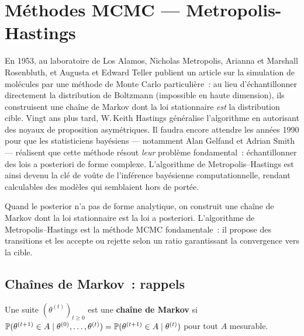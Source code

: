 \chapter{M\'ethodes MCMC --- Metropolis-Hastings}
\label{ch:metropolis}

En 1953, au laboratoire de Los Alamos, Nicholas Metropolis, Arianna et Marshall Rosenbluth, et Augusta et Edward Teller publient un article sur la simulation de mol\'ecules par une m\'ethode de Monte Carlo particuli\`ere~: au lieu d'\'echantillonner directement la distribution de Boltzmann (impossible en haute dimension), ils construisent une cha\^ine de Markov dont la loi stationnaire \emph{est} la distribution cible. Vingt ans plus tard, W.\,Keith Hastings g\'en\'eralise l'algorithme en autorisant des noyaux de proposition asym\'etriques. Il faudra encore attendre les ann\'ees 1990 pour que les statisticiens bay\'esiens --- notamment Alan Gelfand et Adrian Smith --- r\'ealisent que cette m\'ethode r\'esout \emph{leur} probl\`eme fondamental~: \'echantillonner des lois a posteriori de forme complexe. L'algorithme de Metropolis--Hastings est ainsi devenu la cl\'e de vo\^ute de l'inf\'erence bay\'esienne computationnelle, rendant calculables des mod\`eles qui semblaient hors de port\'ee.

\begin{intuition}[title=\textbf{Id\'ee centrale}]
Quand le posterior n'a pas de forme analytique, on construit une
cha\^ine de Markov dont la loi stationnaire est la loi a posteriori.
L'algorithme de Metropolis--Hastings est la m\'ethode MCMC fondamentale~:
il propose des transitions et les accepte ou rejette selon un ratio
garantissant la convergence vers la cible.
\end{intuition}

\section{Cha\^ines de Markov~: rappels}

\begin{definition}
Une suite $(\theta^{(t)})_{t \geq 0}$ est une \textbf{cha\^ine de Markov}
si $\mathbb{P}(\theta^{(t+1)} \in A \mid \theta^{(0)}, \ldots, \theta^{(t)})
= \mathbb{P}(\theta^{(t+1)} \in A \mid \theta^{(t)})$ pour tout $A$ mesurable.
\end{definition}

